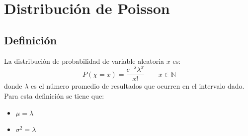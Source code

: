\section{Distribución de Poisson}
\subsection{Definición}
La distribución de probabilidad de variable aleatoria $x$ es:
\begin{equation}
    P(\chi=x) = \frac{e^{-\lambda}\lambda^x}{x!} \qquad x\in \mathbb{N}
\end{equation}
donde $\lambda$ es el número promedio de resultados que ocurren en el intervalo dado.
Para esta definición se tiene que:
\begin{itemize}
    \item $\mu=\lambda$
    \item $\sigma^2= \lambda$
\end{itemize}
